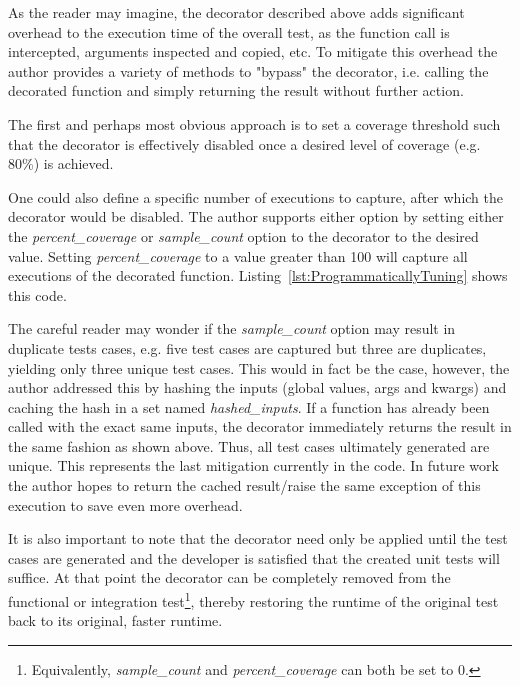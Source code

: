 \documentclass[10pt, conference]{IEEEtran}
\begin{document}
As the reader may imagine, the decorator described above adds significant overhead 
to the execution time of the overall test, as the function call is intercepted,
arguments inspected and copied, etc.  To mitigate this overhead the author provides 
a variety of methods to "bypass" the decorator, i.e. calling the decorated 
function and simply returning the result without further action.

The first and perhaps most obvious approach is to set a coverage threshold such 
that the decorator is effectively disabled once a desired level of coverage 
(e.g. 80\%) is achieved. 

One could also define a specific number 
of executions to capture, after which the decorator would be disabled. 
The author supports either option by setting either the \textit{percent\_coverage} or 
\textit{sample\_count} option to the decorator to the desired value.  Setting 
\textit{percent\_coverage} to a value greater than 100 will capture all 
executions of the decorated function.  Listing~\ref{lst:ProgrammaticallyTuning}
shows this code.


The careful reader may wonder if the \textit{sample\_count} option may result in 
duplicate tests cases, e.g. five test cases are captured but three are duplicates, 
yielding only three unique test cases.  This would in fact be the case, however, the author 
addressed this by hashing the inputs (global values, args and kwargs) and 
caching the hash in a set named \textit{hashed\_inputs}.  If a function has
already been called with the exact same inputs, the decorator immediately returns
the result in the same fashion as shown above. Thus, all test cases 
ultimately generated are unique.  This represents the last mitigation
currently in the code.  In future work the author hopes to return the cached 
result/raise the same exception of this execution to save even more overhead.  

It is also important to note that the decorator need only be applied until the 
test cases are generated and the developer is satisfied that the created unit
tests will suffice.  At that point the decorator can be completely removed
from the functional or integration test\footnote{Equivalently, 
\textit{sample\_count} and \textit{percent\_coverage} can both be set to 0.}, 
thereby restoring the runtime of
the original test back to its original, faster runtime.  
\end{document}
